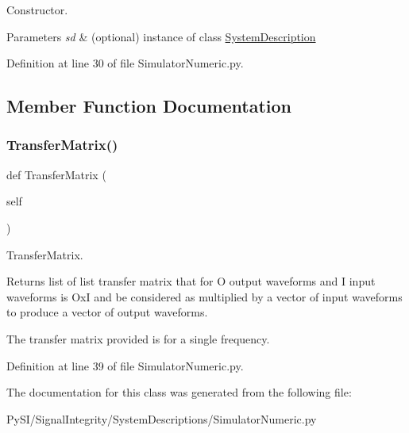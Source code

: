 Constructor. 


\begin{DoxyParams}{Parameters}
{\em sd} & (optional) instance of class \hyperlink{namespaceSignalIntegrity_1_1SystemDescriptions_1_1SystemDescription}{System\+Description} \\
\hline
\end{DoxyParams}


Definition at line 30 of file Simulator\+Numeric.\+py.



\subsection{Member Function Documentation}
\mbox{\label{classSignalIntegrity_1_1SystemDescriptions_1_1SimulatorNumeric_1_1SimulatorNumeric_aecf838369a0d4e9037ba351539bd8eb1}} 
\subsubsection{\texorpdfstring{Transfer\+Matrix()}{TransferMatrix()}}
{\footnotesize\ttfamily def Transfer\+Matrix (\begin{DoxyParamCaption}\item[{}]{self }\end{DoxyParamCaption})}



Transfer\+Matrix. 

\begin{DoxyReturn}{Returns}
list of list transfer matrix that for O output waveforms and I input waveforms is OxI and be considered as multiplied by a vector of input waveforms to produce a vector of output waveforms.
\end{DoxyReturn}
The transfer matrix provided is for a single frequency. 

Definition at line 39 of file Simulator\+Numeric.\+py.



The documentation for this class was generated from the following file\+:\begin{DoxyCompactItemize}
\item 
Py\+S\+I/\+Signal\+Integrity/\+System\+Descriptions/Simulator\+Numeric.\+py\end{DoxyCompactItemize}
